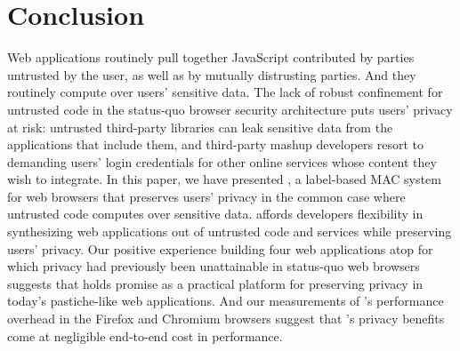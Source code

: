 \section{Conclusion}
\label{sec:conclusion}

Web applications routinely pull together JavaScript contributed by
parties untrusted by the user, as well as by mutually distrusting
parties. And they routinely compute over users' sensitive data. The
lack of robust confinement for untrusted code in the status-quo
browser security architecture puts users' privacy at risk: untrusted
third-party libraries can leak sensitive data from the applications
that include them, and third-party mashup developers resort to
demanding users' login credentials for other online services whose
content they wish to integrate. In this paper, we have presented
\sys{}, a label-based MAC system for web browsers that preserves
users' privacy in the common case where untrusted code computes over
sensitive data. \sys{} affords developers flexibility in synthesizing
web applications out of untrusted code and services while preserving
users' privacy. Our positive experience building four web applications
atop \sys{} for which privacy had previously been unattainable in
status-quo web browsers suggests that \sys{} holds promise as a
practical platform for preserving privacy in today's pastiche-like web
applications. And our measurements of \sys{}'s performance overhead in
the Firefox and Chromium browsers suggest that \sys{}'s privacy
benefits come at negligible end-to-end cost in performance.

